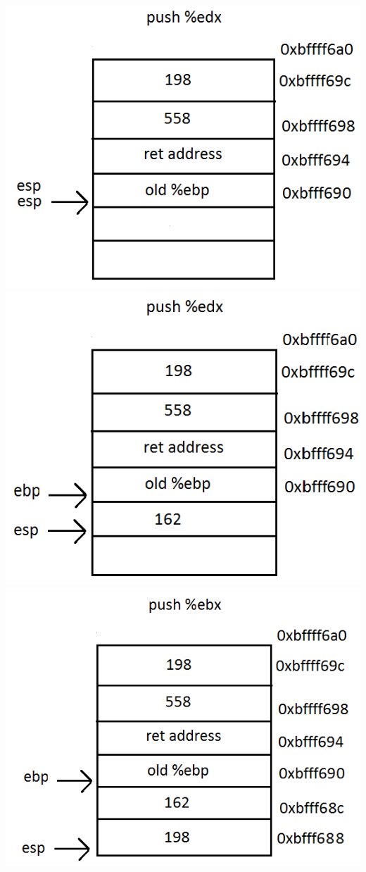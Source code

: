 \documentclass{article}
\begin{document}
\includegraphics[scale=0.5]{stack4.png}\\
\includegraphics[scale=0.5]{stack5.png} 
\includegraphics[scale=0.5]{stack6.png}\\
\end{document}
